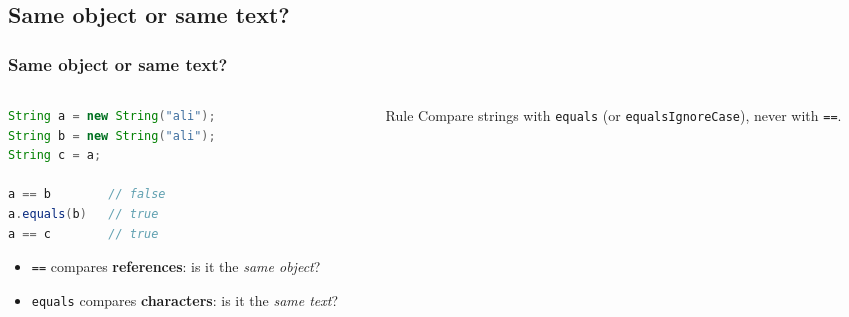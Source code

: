 \documentclass[aspectratio=169,10pt,compress]{beamer}
\begin{document}

\subsection[Same]{Same object or same text?}




\begin{frame}[t,fragile] \frametitle{Same object or same text?}
  \begin{columns}[T]
    \begin{column}{0.46\textwidth}


\begin{lstlisting}[style=codesnippet, language=Java]
String a = new String("ali");
String b = new String("ali");
String c = a;

a == b        // false
a.equals(b)   // true
a == c        // true
\end{lstlisting}



      \begin{itemize}\small
        \item \texttt{==} compares \textbf{references}: is it the \emph{same object}?
        \item \texttt{equals} compares \textbf{characters}: is it the \emph{same text}?
      \end{itemize}
    \end{column}
    \begin{column}{0.5\textwidth}
      \begin{center}
      \end{center}
      \begin{alertblock}{Rule}
        \small Compare strings with \texttt{equals} (or \texttt{equalsIgnoreCase}), never with \texttt{==}.
      \end{alertblock}
    \end{column}
  \end{columns}
\end{frame}
\end{document}
